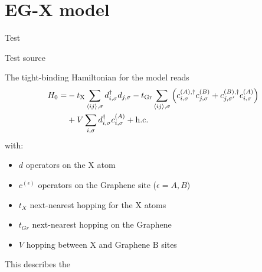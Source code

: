\documentclass[../main.tex]{subfiles}
\begin{document}
\chapter{EG-X model}

\epigraph{Test}{Test source}

The tight-binding Hamiltonian for the model reads
\begin{align}
	H_0 = &-t_{\mathrm{X}} \sum_{\langle ij \rangle, \sigma} d_{i, \sigma}^{\dagger} d_{j, \sigma}
	-t_{\mathrm{Gr}} \sum_{\langle ij \rangle, \sigma} \left(
	c_{i, \sigma}^{(A), \dagger} c_{j, \sigma}^{(B)} +
	c_{j, \sigma^{\prime}}^{(B), \dagger} c_{i, \sigma}^{(A)} \right) \notag \\
	&+ V \sum_{i, \sigma} d_{i, \sigma}^{\dagger} c_{i, \sigma}^{(A)} + \mathrm{h.c.} \label{eq:EG-X model Hamiltonian non-interacting}
\end{align}
with:
\begin{itemize}
	\item \(d\) operators on the \(\mathrm{X}\) atom
	\item \(c^{(\epsilon)}\) operators on the Graphene site (\(\epsilon = A, B\))
	\item \(t_X\) next-nearest hopping for the \(\mathrm{X}\) atoms
	\item \(t_{Gr}\) next-nearest hopping on the Graphene
	\item \(V\) hopping between \(\mathrm{X}\) and Graphene \(\mathrm{B}\) sites
\end{itemize}
This describes the
\end{document}
